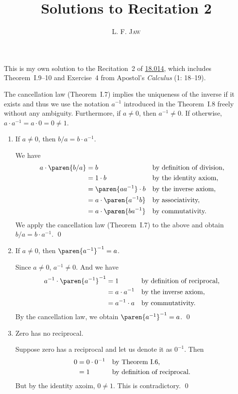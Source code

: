 \documentclass[a4paper]{article}
\title{Solutions to Recitation 2}
\author{L. F. \textsc{Jaw}}
\begin{document}
\maketitle

This is my own solution to the Recitation~2 of
\href{https://ocw.mit.edu/courses/mathematics/18-014-calculus-with-theory-fall-2010/recitations/}{18.014},
which includes Theorem~I.9--10 and Exercise~4 from Apostol's
\textit{Calculus} (1: 18--19).

\pskip

The cancellation law (Theorem~I.7) implies the uniqueness of the
inverse if it exists and thus we use the notation \(a^{-1}\)
introduced in the Theorem~I.8 freely without any ambiguity.
Furthermore, if \(a \ne 0\), then \(a^{-1} \ne 0\).  If otherwise,
\(a \cdot a^{-1} = a \cdot 0 = 0 \ne 1\).

\begin{enumerate}
\item If \(a \ne 0\), then \(b/a = b \cdot a^{-1}\).

  We have
  \begin{align*}
    a \cdot \paren{b/a}
    &= b                        && \reason{by definition of division,} \\
    &= 1 \cdot b                && \reason{by the identity axiom,}\\
    &= \paren{aa^{-1}} \cdot b  && \reason{by the inverse axiom,} \\
    &= a \cdot \paren{a^{-1} b} && \reason{by associativity,} \\
    &= a \cdot \paren{ba^{-1}}  && \reason{by commutativity.}
  \end{align*}
  We apply the cancellation law (Theorem~I.7) to the above and obtain
  \(b/a = b \cdot a^{-1}\).  \qed

\item If \(a \ne 0\), then \(\paren{a^{-1}}^{-1} = a\).

  Since \(a \ne 0\), \(a^{-1} \ne 0\).  And we have
  \begin{align*}
    a^{-1} \cdot \paren{a^{-1}}^{-1}
    &= 1              && \reason{by definition of reciprocal,} \\
    &= a \cdot a^{-1} && \reason{by the inverse axiom,} \\
    &= a^{-1} \cdot a && \reason{by commutativity.}
  \end{align*}
  By the cancellation law, we obtain \(\paren{a^{-1}}^{-1} = a\).  \qed

\item Zero has no reciprocal.

  Suppose zero has a reciprocal and let us denote it as \(0^{-1}\).  Then
  \begin{align*}
    0 &= 0 \cdot 0^{-1} && \text{by Theorem~I.6,} \\
      &= 1              && \text{by definition of reciprocal.}
  \end{align*}
  But by the identity axoim, \(0 \ne 1\).  This is contradictory.  \qed
\end{enumerate}
\end{document}
